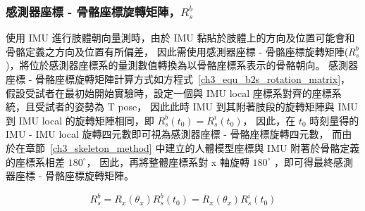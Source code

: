 \subsubsection{感測器座標 - 骨骼座標旋轉矩陣，$R^b_s$}
使用 IMU 進行肢體朝向量測時，由於 IMU 黏貼於肢體上的方向及位置可能會和骨骼定義之方向及位置有所偏差，
因此需使用感測器座標 - 骨骼座標旋轉矩陣($R^b_s$)，將位於感測器座標系的量測數值轉換為以骨骼座標系表示的骨骼朝向。
感測器座標 - 骨骼座標旋轉矩陣計算方式如方程式~\ref{ch3_equ_b2s_rotation_matrix}，
假設受試者在最初始開始實驗時，設定一個與 IMU local 座標系對齊的座標系統，且受試者的姿勢為 T pose，
因此此時 IMU 到其附著肢段的旋轉矩陣與 IMU 到 IMU local 的旋轉矩陣相同，即 $R^{b}_{s}(t_0) = R^{i}_{s}(t_0)$，
因此，在 $t_0$ 時刻量得的 IMU - IMU local 旋轉四元數即可視為感測器座標 - 骨骼座標旋轉四元數，
而由於在章節~\ref{ch3_skeleton_method} 中建立的人體模型座標與 IMU 附著於骨骼定義的座標系相差 $180^{\circ}$，
因此，再將整體座標系對 x 軸旋轉 $180^{\circ}$ ，即可得最終感測器座標 - 骨骼座標旋轉矩陣。 

\begin{equation}
   R^{b}_{s} = R_{x}(\theta_{x})R^{b}_{s}(t_0) = R_{x}(\theta_{x})R^{i}_{s}(t_0)
   \label{ch3_equ_b2s_rotation_matrix}
\end{equation}


